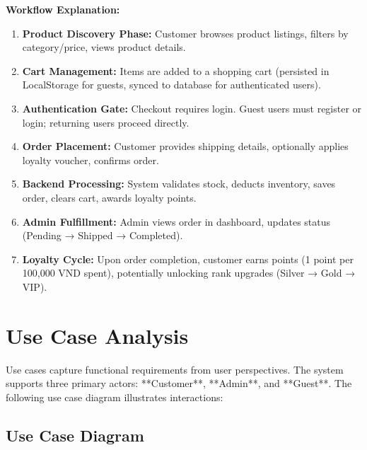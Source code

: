 \textbf{Workflow Explanation:}
\begin{enumerate}
    \item \textbf{Product Discovery Phase:} Customer browses product listings, filters by category/price, views product details.
    \item \textbf{Cart Management:} Items are added to a shopping cart (persisted in LocalStorage for guests, synced to database for authenticated users).
    \item \textbf{Authentication Gate:} Checkout requires login. Guest users must register or login; returning users proceed directly.
    \item \textbf{Order Placement:} Customer provides shipping details, optionally applies loyalty voucher, confirms order.
    \item \textbf{Backend Processing:} System validates stock, deducts inventory, saves order, clears cart, awards loyalty points.
    \item \textbf{Admin Fulfillment:} Admin views order in dashboard, updates status (Pending → Shipped → Completed).
    \item \textbf{Loyalty Cycle:} Upon order completion, customer earns points (1 point per 100,000 VND spent), potentially unlocking rank upgrades (Silver → Gold → VIP).
\end{enumerate}

\section{Use Case Analysis}

Use cases capture functional requirements from user perspectives. The system supports three primary actors: **Customer**, **Admin**, and **Guest**. The following use case diagram illustrates interactions:

\subsection{Use Case Diagram}

